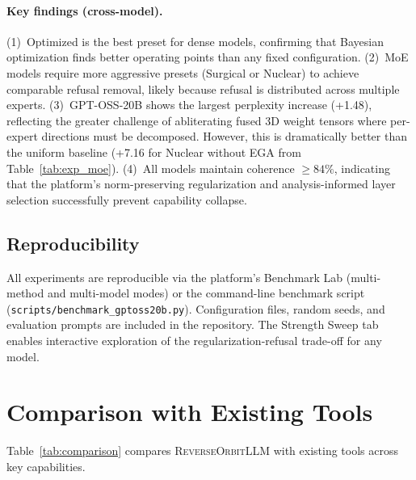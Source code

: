 \documentclass[11pt]{article}
\begin{document}
\paragraph{Key findings (cross-model).}
(1)~Optimized is the best preset for dense models, confirming that Bayesian optimization finds better operating points than any fixed configuration.
(2)~MoE models require more aggressive presets (Surgical or Nuclear) to achieve comparable refusal removal, likely because refusal is distributed across multiple experts.
(3)~GPT-OSS-20B shows the largest perplexity increase (+1.48), reflecting the greater challenge of abliterating fused 3D weight tensors where per-expert directions must be decomposed. However, this is dramatically better than the uniform baseline (+7.16 for Nuclear without EGA from Table~\ref{tab:exp_moe}).
(4)~All models maintain coherence $\geq 84\%$, indicating that the platform's norm-preserving regularization and analysis-informed layer selection successfully prevent capability collapse.

\subsection{Reproducibility}

All experiments are reproducible via the platform's Benchmark Lab (multi-method and multi-model modes) or the command-line benchmark script (\texttt{scripts/benchmark\_gptoss20b.py}). Configuration files, random seeds, and evaluation prompts are included in the repository. The Strength Sweep tab enables interactive exploration of the regularization-refusal trade-off for any model.

\section{Comparison with Existing Tools}
\label{sec:comparison}

Table~\ref{tab:comparison} compares \textsc{ReverseOrbitLLM} with existing tools across key capabilities.
\end{document}
